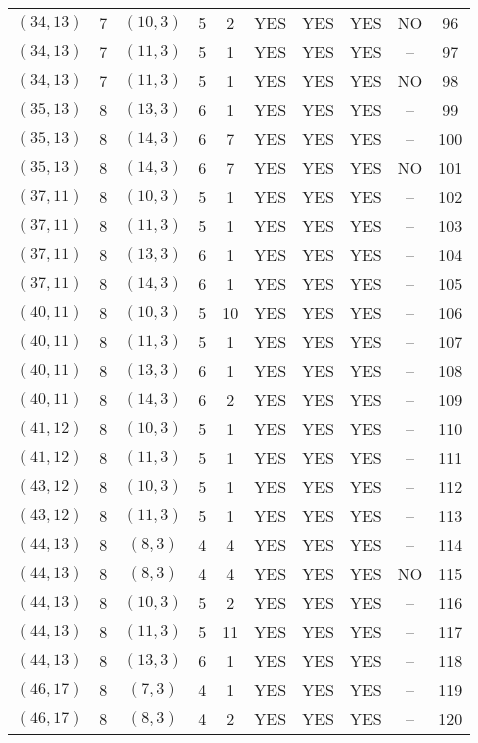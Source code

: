 \begin{longtable}{|c|c|c|c|c|c|c|c|c|c|}
$(34, 13)$ & 7 & $(10, 3)$ & 5 & 2 & YES & YES & YES & NO & 96\\
$(34, 13)$ & 7 & $(11, 3)$ & 5 & 1 & YES & YES & YES & -- & 97\\
$(34, 13)$ & 7 & $(11, 3)$ & 5 & 1 & YES & YES & YES & NO & 98\\
$(35, 13)$ & 8 & $(13, 3)$ & 6 & 1 & YES & YES & YES & -- & 99\\
$(35, 13)$ & 8 & $(14, 3)$ & 6 & 7 & YES & YES & YES & -- & 100\\
$(35, 13)$ & 8 & $(14, 3)$ & 6 & 7 & YES & YES & YES & NO & 101\\
$(37, 11)$ & 8 & $(10, 3)$ & 5 & 1 & YES & YES & YES & -- & 102\\
$(37, 11)$ & 8 & $(11, 3)$ & 5 & 1 & YES & YES & YES & -- & 103\\
$(37, 11)$ & 8 & $(13, 3)$ & 6 & 1 & YES & YES & YES & -- & 104\\
$(37, 11)$ & 8 & $(14, 3)$ & 6 & 1 & YES & YES & YES & -- & 105\\
$(40, 11)$ & 8 & $(10, 3)$ & 5 & 10 & YES & YES & YES & -- & 106\\
$(40, 11)$ & 8 & $(11, 3)$ & 5 & 1 & YES & YES & YES & -- & 107\\
$(40, 11)$ & 8 & $(13, 3)$ & 6 & 1 & YES & YES & YES & -- & 108\\
$(40, 11)$ & 8 & $(14, 3)$ & 6 & 2 & YES & YES & YES & -- & 109\\
$(41, 12)$ & 8 & $(10, 3)$ & 5 & 1 & YES & YES & YES & -- & 110\\
$(41, 12)$ & 8 & $(11, 3)$ & 5 & 1 & YES & YES & YES & -- & 111\\
$(43, 12)$ & 8 & $(10, 3)$ & 5 & 1 & YES & YES & YES & -- & 112\\
$(43, 12)$ & 8 & $(11, 3)$ & 5 & 1 & YES & YES & YES & -- & 113\\
$(44, 13)$ & 8 & $(8, 3)$ & 4 & 4 & YES & YES & YES & -- & 114\\
$(44, 13)$ & 8 & $(8, 3)$ & 4 & 4 & YES & YES & YES & NO & 115\\
$(44, 13)$ & 8 & $(10, 3)$ & 5 & 2 & YES & YES & YES & -- & 116\\
$(44, 13)$ & 8 & $(11, 3)$ & 5 & 11 & YES & YES & YES & -- & 117\\
$(44, 13)$ & 8 & $(13, 3)$ & 6 & 1 & YES & YES & YES & -- & 118\\
$(46, 17)$ & 8 & $(7, 3)$ & 4 & 1 & YES & YES & YES & -- & 119\\
$(46, 17)$ & 8 & $(8, 3)$ & 4 & 2 & YES & YES & YES & -- & 120\\

\end{longtable}
